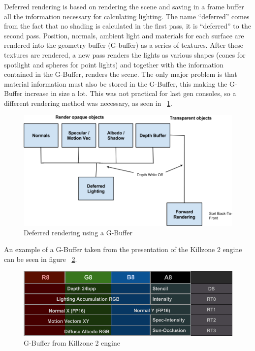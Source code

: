 Deferred rendering is based on rendering the scene and saving in a frame buffer all the information necessary for calculating lighting. The name “deferred” comes from the fact that no shading is calculated in the first pass, it is “deferred” to the second pass. Position, normals, ambient light and materials for each surface are rendered into the geometry buffer (G-buffer) as a series of textures. After these textures are rendered, a new pass renders the lights as various shapes (cones for spotlight and spheres for point lights) and together with the information contained in the G-Buffer, renders the scene. The only major problem is that material information must also be stored in the G-Buffer, this making the G-Buffer increase in size a lot. This was not practical for last gen consoles, so a different rendering method was necessary, as seen in ~\ref{img:deferred2}.
\begin{center}
\begin{figure}[here]
	
\includegraphics[width=\textwidth]{src/img/deferred2.png}
\caption{Deferred rendering using a G-Buffer}
\label{img:deferred2}
\end{figure}
\end{center}

An example of a G-Buffer taken from the presentation of the Killzone 2 engine can be seen in figure ~\ref{img:deferred1}.

\begin{center}
	\begin{figure}[here]
		
		\includegraphics[width=\textwidth]{src/img/deferred1.png}
		\caption{G-Buffer from Killzone 2 engine}
		\label{img:deferred1}
	\end{figure}
\end{center}

